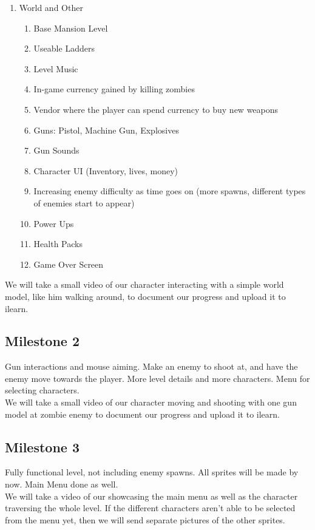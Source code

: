 \documentclass{article}
\begin{document}
\begin{enumerate}
    \item World and Other
        \begin{enumerate}
            \item Base Mansion Level
            \item Useable Ladders
            \item Level Music
            \item In-game currency gained by killing zombies
            \item Vendor where the player can spend currency to buy new weapons
            \item Guns: Pistol, Machine Gun, Explosives
            \item Gun Sounds
            \item Character UI (Inventory, lives, money)
            \item Increasing enemy difficulty as time goes on (more spawns, different types of enemies start to appear)
            \item Power Ups
            \item Health Packs
            \item Game Over Screen
        \end{enumerate}
\end{enumerate}
    
    We will take a small video of our character interacting with a simple world model, like him walking around, to document our progress and upload it to ilearn. 
\subsection{Milestone 2}
    Gun interactions and mouse aiming. Make an enemy to shoot at, and have the enemy move towards the player. More level details and more characters. Menu for selecting characters. 
    \\We will take a small video of our character moving and shooting with one gun model at zombie enemy to document our progress and upload it to ilearn. 
\subsection{Milestone 3}
    Fully functional level, not including enemy spawns. All sprites will be made by now. Main Menu done as well.
    \\We will take a  video of our showcasing the main menu as well as the character traversing the whole level. If the different characters aren't able to be selected from the menu yet, then we will send separate pictures of the other sprites.
\end{document}
